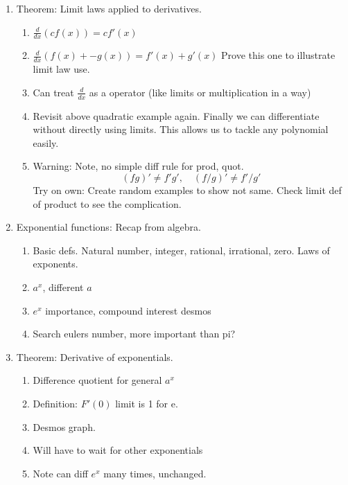 \documentclass{article}
\begin{document}
\begin{enumerate}
\item Theorem: Limit laws applied to derivatives.
\begin{enumerate}
\item $\frac{d}{dx} (cf(x)) = cf'(x)$
\item $\frac{d}{dx} (f(x) +- g(x)) = f'(x)+g'(x)$ Prove this one to illustrate limit law use.
\item Can treat $\frac{d}{dx}$ as a operator (like limits or multiplication in a way)
\item Revisit above quadratic example again. Finally we can differentiate without directly using limits. This allows us to tackle any polynomial easily.
\item Warning: Note, no simple diff rule for prod, quot.
\[
(f g)' \neq f' g', \quad 
(f / g)' \neq f'/g'\]
Try on own: Create random examples to show not same. Check limit def of product to see the complication.
\end{enumerate}

\item Exponential functions: Recap from algebra.
\begin{enumerate}
\item Basic defs. Natural number, integer, rational, irrational, zero. Laws of exponents. 
\item $a^x$, different $a$
\item $e^x$ importance, compound interest desmos
\item Search eulers number, more important than pi?
\end{enumerate}

\item Theorem: Derivative of exponentials.
\begin{enumerate}
\item Difference quotient for general $a^x$
\item Definition: $F'(0)$ limit is 1 for e.
\item Desmos graph.
\item Will have to wait for other exponentials
\item Note can diff $e^x$ many times, unchanged.
\end{enumerate}

\end{enumerate}


\end{document}
